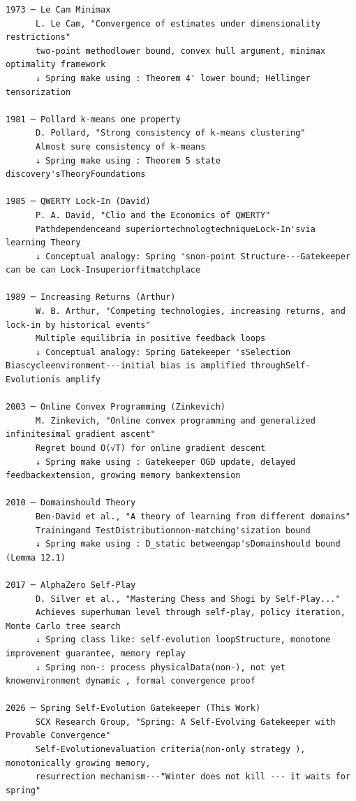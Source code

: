 \documentclass[
  12pt,
]{article}
\begin{document}
\begin{verbatim}
1973 ─ Le Cam Minimax
      L. Le Cam, "Convergence of estimates under dimensionality restrictions"
      two-point methodlower bound, convex hull argument, minimax optimality framework
      ↓ Spring make using : Theorem 4' lower bound; Hellinger tensorization
      
1981 ─ Pollard k-means one property 
      D. Pollard, "Strong consistency of k-means clustering"
      Almost sure consistency of k-means
      ↓ Spring make using : Theorem 5 state discovery'sTheoryFoundations

1985 ─ QWERTY Lock-In (David)
      P. A. David, "Clio and the Economics of QWERTY"
      Pathdependenceand superiortechnologtechniqueLock-In'svia learning Theory
      ↓ Conceptual analogy: Spring 'snon-point Structure---Gatekeeper can be can Lock-Insuperiorfitmatchplace
      
1989 ─ Increasing Returns (Arthur)
      W. B. Arthur, "Competing technologies, increasing returns, and lock-in by historical events"
      Multiple equilibria in positive feedback loops
      ↓ Conceptual analogy: Spring Gatekeeper 'sSelection Biascycleenvironment---initial bias is amplified throughSelf-Evolutionis amplify

2003 ─ Online Convex Programming (Zinkevich)
      M. Zinkevich, "Online convex programming and generalized infinitesimal gradient ascent"
      Regret bound O(√T) for online gradient descent
      ↓ Spring make using : Gatekeeper OGD update, delayed feedbackextension, growing memory bankextension

2010 ─ Domainshould Theory
      Ben-David et al., "A theory of learning from different domains"
      Trainingand TestDistributionnon-matching'sization bound 
      ↓ Spring make using : D_static betweengap'sDomainshould bound  (Lemma 12.1)

2017 ─ AlphaZero Self-Play
      D. Silver et al., "Mastering Chess and Shogi by Self-Play..."
      Achieves superhuman level through self-play, policy iteration, Monte Carlo tree search
      ↓ Spring class like: self-evolution loopStructure, monotone improvement guarantee, memory replay
      ↓ Spring non-: process physicalData(non-), not yet knowenvironment dynamic , formal convergence proof

2026 ─ Spring Self-Evolution Gatekeeper (This Work)
      SCX Research Group, "Spring: A Self-Evolving Gatekeeper with Provable Convergence"
      Self-Evolutionevaluation criteria(non-only strategy ), monotonically growing memory, 
      resurrection mechanism---"Winter does not kill --- it waits for spring"
\end{verbatim}
\end{document}
